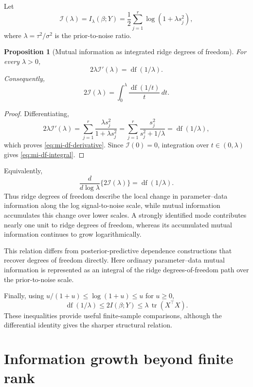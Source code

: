 \documentclass[11pt]{article}
\theoremstyle{plain}
\newtheorem{proposition}{Proposition}
\theoremstyle{definition}
\theoremstyle{remark}
\begin{document}
Let
\[
\mathcal I(\lambda)
=
I_\lambda(\beta;Y)
=
\frac12\sum_{j=1}^r \log(1+\lambda s_j^2),
\]
where \(\lambda=\tau^2/\sigma^2\) is the prior-to-noise ratio.

\begin{proposition}[Mutual information as integrated ridge degrees of freedom]
	\label{prop:mi-df-identity}
	For every \(\lambda>0\),
	\begin{equation}
		\label{eq:mi-df-derivative}
		2\lambda \mathcal I'(\lambda)
		=
		\operatorname{df}(1/\lambda).
	\end{equation}
	Consequently,
	\begin{equation}
		\label{eq:mi-df-integral}
		2\mathcal I(\lambda)
		=
		\int_0^\lambda
		\frac{\operatorname{df}(1/t)}{t}\,dt.
	\end{equation}
\end{proposition}

\begin{proof}
	Differentiating,
	\[
	2\lambda \mathcal I'(\lambda)
	=
	\sum_{j=1}^r
	\frac{\lambda s_j^2}{1+\lambda s_j^2}
	=
	\sum_{j=1}^r
	\frac{s_j^2}{s_j^2+1/\lambda}
	=
	\operatorname{df}(1/\lambda),
	\]
	which proves \eqref{eq:mi-df-derivative}. Since \(\mathcal I(0)=0\), integration over \(t\in(0,\lambda)\) gives \eqref{eq:mi-df-integral}.
\end{proof}

Equivalently,
\[
\frac{d}{d\log\lambda}\{2\mathcal I(\lambda)\}
=
\operatorname{df}(1/\lambda).
\]
Thus ridge degrees of freedom describe the local change in parameter--data information along the log signal-to-noise scale, while mutual information accumulates this change over lower scales. A strongly identified mode contributes nearly one unit to ridge degrees of freedom, whereas its accumulated mutual information continues to grow logarithmically.

This relation differs from posterior-predictive dependence constructions that recover degrees of freedom directly. Here ordinary parameter--data mutual information is represented as an integral of the ridge degrees-of-freedom path over the prior-to-noise scale.

Finally, using \(u/(1+u)\leq \log(1+u)\leq u\) for \(u\geq0\),
\[
\operatorname{df}(1/\lambda)
\leq
2I(\beta;Y)
\leq
\lambda\,\operatorname{tr}(X^\top X).
\]
These inequalities provide useful finite-sample comparisons, although the differential identity gives the sharper structural relation.



\section{Information growth beyond finite rank}
\label{sec:consequences}
\end{document}
